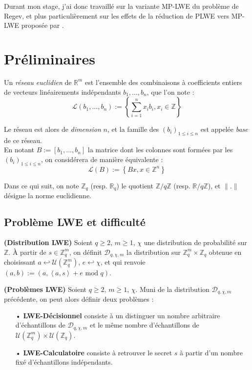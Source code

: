 \documentclass[11pt,a4paper]{article}
\begin{document}
Durant mon stage, j'ai donc travaillé sur la variante MP-LWE du problème de Regev, et plus particulièrement sur les effets de la réduction de PLWE vers MP-LWE proposée par \cite{mplwe}.
\\

\section{Préliminaires}
\begin{defin} 
Un \textit{réseau euclidien} de $\mathbb{R}^m$ est l'ensemble des combinaisons à coefficients entiers de vecteurs linéairements indépendants $b_1, \dots, b_n$, que l'on note :
\[\mathcal{L}(b_1,\dots,b_n) := \left\{ \sum_{i=1}^n x_ib_i, x_i \in \mathbb{Z} \right\} \]

Le réseau est alors de \textit{dimension} $n$, et la famille des $(b_i)_{1\leq i \leq n}$ est appelée \textit{base} de ce réseau. \\

En notant $B:=[b_1,\dots,b_n]$ la matrice dont les colonnes sont formées par les $(b_i)_{1\leq i \leq n}$, on considérera de manière équivalente : \[\mathcal{L}(B) := \left\{ Bx, x \in \mathbb{Z}^n \right\} \]
\end{defin}

Dans ce qui suit, on note $\mathbb{Z}_q$ (resp. $\mathbb{R}_q$) le quotient $\mathbb{Z}/q\mathbb{Z}$ (resp. $\mathbb{R}/q\mathbb{Z}$), et $\|.\|$ désigne la norme euclidienne.

\subsection{Problème LWE et difficulté}

\begin{defin}\textbf{(Distribution LWE)}
Soient $q\geq 2$, $m\geq 1$, $\chi$ une distribution de probabilité sur $\mathbb{Z}$. À partir de $s\in \mathbb{Z}_q^m$, on définit $\mathcal{D}_{q,\chi,m}$ la distribution sur $\mathbb{Z}_q^m\times\mathbb{Z}_q$ obtenue en choisissant $a \hookleftarrow \mathcal{U}(\mathbb{Z}_q^m)$, $e\hookleftarrow \chi$, et qui renvoie $(a,b):=(a,\left<a,s\right> +e \text{ mod } q)$.
\end{defin}

\begin{defin}\textbf{(Problèmes LWE)}
Soient $q\geq 2$, $m\geq 1$, $\chi$. Muni de la distribution $\mathcal{D}_{q,\chi,m}$ précédente, on peut alors définir deux problèmes : 
\begin{enumerate}
\item[•]\textbf{LWE-Décisionnel} consiste à un distinguer un nombre arbitraire d'échantillons de $\mathcal{D}_{q,\chi,m}$ et le même nombre d'échantillons de $\mathcal{U}(\mathbb{Z}_q^m)\times\mathcal{U}(\mathbb{Z}_q)$.
\item[•]\textbf{LWE-Calculatoire} consiste à retrouver le secret $s$ à partir d'un nombre fixé d'échantillons indépendants.
\end{enumerate}
\end{defin}
\end{document}
